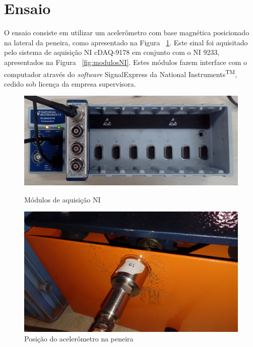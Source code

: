 \documentclass[
	12pt,				%
	openright,			%
	twoside,			%
	a4paper,			%
	english,			%
	french,				%
	spanish,			%
	brazil,				%
	]{abntex2}
\begin{document}
		\newpage

	\section{Ensaio}
		O ensaio consiste em utilizar um acelerômetro com base magnética
		posicionado na lateral da peneira, como apresentado na Figura
		~\ref{fig:accNaLateral}. Este sinal foi aquisitado pelo sistema de aquisição NI
		cDAQ-9178 em conjunto com o NI 9233, apresentados na Figura ~\ref{fig:modulosNI}.
		Estes módulos fazem interface com o computador através do
		\textit{software} SignalExpress da National
		Instruments\textsuperscript{TM}, cedido sob licença da empresa
		supervisora.

		\begin{figure}[!ht]
			\centering
			\begin{minipage}{0.4\linewidth}
				\centering
				\includegraphics[width = \linewidth]{../Fotos/cdaq.jpg}
				\caption{Módulos de aquisição NI}
				\label{fig:modulosNI}
			\end{minipage}
			\hfill\vline\hfill
			\begin{minipage}{0.4\linewidth}
				\centering
				\includegraphics[width = \linewidth]{../Fotos/peneiraLateralZoom.jpg}
				\caption{Posição do acelerômetro na peneira}
				\label{fig:accNaLateral}
			\end{minipage}
		\end{figure}
\end{document}
